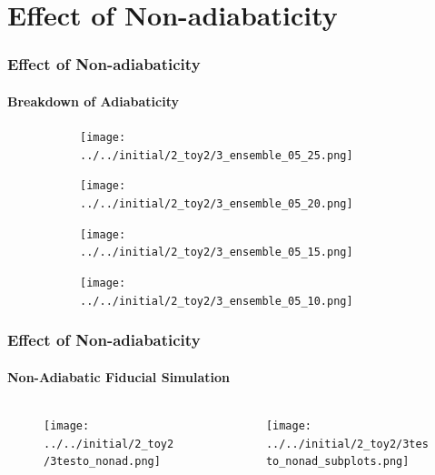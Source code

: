 \documentclass[dvipsnames]{beamer}
\begin{document}
\section{Effect of Non-adiabaticity}

\begin{frame}
    \frametitle{Effect of Non-adiabaticity}
    \framesubtitle{Breakdown of Adiabaticity}
    \begin{figure}[t]
        \centering
        \begin{subfigure}{0.45\textwidth}
            \centering
            \texttt{[image: ../../initial/2\_toy2/3\_ensemble\_05\_25.png]}
        \end{subfigure}
        \begin{subfigure}{0.45\textwidth}
            \centering
            \texttt{[image: ../../initial/2\_toy2/3\_ensemble\_05\_20.png]}
        \end{subfigure}

        \begin{subfigure}{0.45\textwidth}
            \centering
            \texttt{[image: ../../initial/2\_toy2/3\_ensemble\_05\_15.png]}
        \end{subfigure}
        \begin{subfigure}{0.45\textwidth}
            \centering
            \texttt{[image: ../../initial/2\_toy2/3\_ensemble\_05\_10.png]}
        \end{subfigure}
    \end{figure}
\end{frame}

\begin{frame}
    \frametitle{Effect of Non-adiabaticity}
    \framesubtitle{Non-Adiabatic Fiducial Simulation}

    \begin{columns}
        \begin{column}{0.5\textwidth}
            \begin{figure}[t]
                \centering
                \texttt{[image: ../../initial/2\_toy2/3testo\_nonad.png]}
            \end{figure}
        \end{column}
        \begin{column}{0.5\textwidth}
            \begin{figure}[t]
                \centering
                \texttt{[image: ../../initial/2\_toy2/3testo\_nonad\_subplots.png]}
            \end{figure}
        \end{column}
    \end{columns}
\end{frame}
\end{document}
